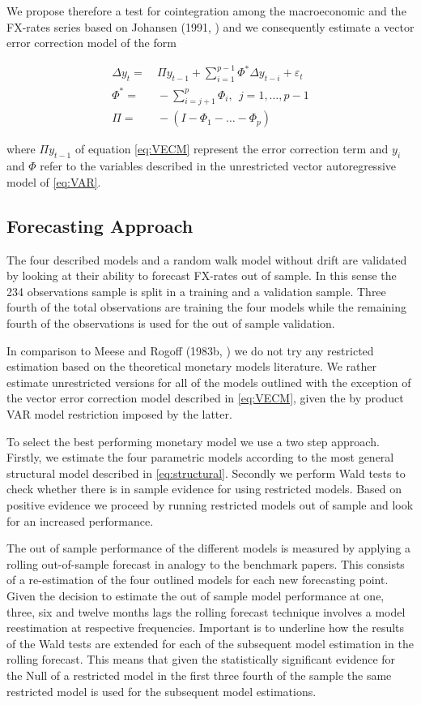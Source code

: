 We propose therefore a test for cointegration among the macroeconomic and the FX-rates series
based on Johansen (1991, \cite{Johansen}) %
and we consequently estimate a vector error correction model of the form

\begin{align}
  \Delta y_t =& \ \Pi y_{t-1} + \sum^{p-1}_{i=1} \Phi^{*} \Delta y_{t-i} + \varepsilon_t \nonumber\\
  \Phi^{*} =& \ - \sum^{p}_{i=j+1} \Phi_i, \ \  j = 1, \dots, p-1 \label{eq:VECM}\\
  \Pi =& \ -(I - \Phi_1 - \dots - \Phi_p) \nonumber\
\end{align}

where $\Pi y_{t-1}$ of equation \ref{eq:VECM} represent the error correction term and $y_i$ and $\Phi$
refer to the variables described in the unrestricted vector autoregressive model of \ref{eq:VAR}.

\subsection{Forecasting Approach}
\label{sub:forecast}
The four described models and a random walk model without drift are validated by looking
at their ability to forecast FX-rates out of sample. In this sense the 234 observations sample
is split in a training and a validation sample. Three fourth of the total observations are
training the four models while the remaining fourth of the observations is used for the
out of sample validation.

In comparison to Meese and Rogoff
(1983b, \cite{MeeseRogoffb}) we do not try any restricted estimation based on the theoretical
monetary models literature. We rather estimate unrestricted versions for all of the models
outlined with the exception of the vector error correction model described in \ref{eq:VECM}, given
the by product VAR model restriction imposed by the latter.

To select the best performing monetary model we use a two step approach. Firstly, we estimate the four 
parametric models according to the most general structural model
described in \ref{eq:structural}. Secondly we perform Wald tests to check whether there is in sample
evidence for using restricted models. Based on positive evidence we proceed by running restricted models
out of sample and look for an increased performance.

The out of sample performance of the different models is measured by applying a rolling
out-of-sample forecast in analogy to the benchmark papers. This consists 
of a re-estimation of the four outlined models for each new forecasting point. Given the decision
to estimate the out of sample model performance at one, three, six and twelve months lags the rolling
forecast technique involves a model reestimation at respective frequencies. Important is to underline how
the results of the Wald tests are extended for each of the subsequent model estimation
in the rolling forecast. This means that given the statistically significant evidence for the Null of a
restricted model in the first three fourth of the sample the same restricted model is used for the
subsequent model estimations. 

